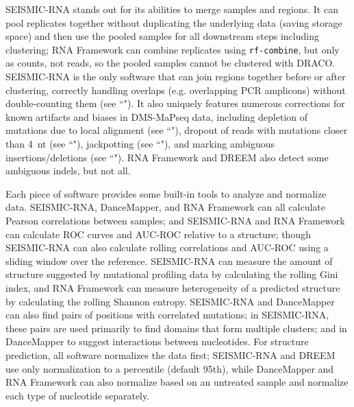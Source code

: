\documentclass[11pt]{article}
\begin{document}
SEISMIC-RNA stands out for its abilities to merge samples and regions. It can pool replicates together without duplicating the underlying data (saving storage space) and then use the pooled samples for all downstream steps including clustering; RNA Framework can combine replicates using \verb|rf-combine|, but only as counts, not reads, so the pooled samples cannot be clustered with DRACO. SEISMIC-RNA is the only software that can join regions together before or after clustering, correctly handling overlaps (e.g. overlapping PCR amplicons) without double-counting them (see ``"). It also uniquely features numerous corrections for known artifacts and biases in DMS-MaPseq data, including depletion of mutations due to local alignment (see ``"), dropout of reads with mutations closer than 4~nt (see ``"), jackpotting (see ``"), and marking ambiguous insertions/deletions (see ``"). RNA Framework and DREEM also detect some ambiguous indels, but not all.

Each piece of software provides some built-in tools to analyze and normalize data. SEISMIC-RNA, DanceMapper, and RNA Framework can all calculate Pearson correlations between samples; and SEISMIC-RNA and RNA Framework can calculate ROC curves and AUC-ROC relative to a structure; though SEISMIC-RNA can also calculate rolling correlations and AUC-ROC using a sliding window over the reference. SEISMIC-RNA can measure the amount of structure suggested by mutational profiling data by calculating the rolling Gini index, and RNA Framework can measure heterogeneity of a predicted structure by calculating the rolling Shannon entropy. 
SEISMIC-RNA and DanceMapper can also find pairs of positions with correlated mutations; in SEISMIC-RNA, these pairs are used primarily to find domains that form multiple clusters; and in DanceMapper to suggest interactions between nucleotides.
For structure prediction, all software normalizes the data first; SEISMIC-RNA and DREEM use only normalization to a percentile (default 95th), while DanceMapper and RNA Framework can also normalize based on an untreated sample and normalize each type of nucleotide separately.
\end{document}

